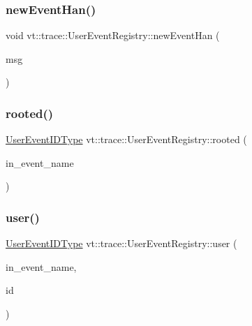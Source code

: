 \mbox{\label{structvt_1_1trace_1_1_user_event_registry_a314bba11008b65bce09a560d3107a5c5}} 
\subsubsection{\texorpdfstring{new\+Event\+Han()}{newEventHan()}}
{\footnotesize\ttfamily void vt\+::trace\+::\+User\+Event\+Registry\+::new\+Event\+Han (\begin{DoxyParamCaption}\item[{\hyperlink{structvt_1_1trace_1_1_user_event_registry_1_1_new_user_event_msg}{New\+User\+Event\+Msg} $\ast$}]{msg }\end{DoxyParamCaption})\hspace{0.3cm}{\ttfamily [static]}}

\mbox{\label{structvt_1_1trace_1_1_user_event_registry_a8b940e39914a9d3ba1acf0a219f6d44d}} 
\subsubsection{\texorpdfstring{rooted()}{rooted()}}
{\footnotesize\ttfamily \hyperlink{namespacevt_1_1trace_a5908920d051c144c89f17c69ed262350}{User\+Event\+I\+D\+Type} vt\+::trace\+::\+User\+Event\+Registry\+::rooted (\begin{DoxyParamCaption}\item[{std\+::string const \&}]{in\+\_\+event\+\_\+name }\end{DoxyParamCaption})}

\mbox{\label{structvt_1_1trace_1_1_user_event_registry_a6a2156b87f22007a4a20ca1b7e96d2fe}} 
\subsubsection{\texorpdfstring{user()}{user()}}
{\footnotesize\ttfamily \hyperlink{namespacevt_1_1trace_a5908920d051c144c89f17c69ed262350}{User\+Event\+I\+D\+Type} vt\+::trace\+::\+User\+Event\+Registry\+::user (\begin{DoxyParamCaption}\item[{std\+::string const \&}]{in\+\_\+event\+\_\+name,  }\item[{\hyperlink{namespacevt_1_1trace_a70c43e0e1596eea236912d4197d3120a}{User\+Spec\+Event\+I\+D\+Type}}]{id }\end{DoxyParamCaption})}



